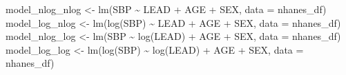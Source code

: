 \documentclass[
  letterpaper,
]{krantz}
\makeatletter
\newenvironment{Shaded}{\begin{snugshade}}{\end{snugshade}}
\newcommand{\AttributeTok}[1]{\textcolor[rgb]{0.40,0.45,0.13}{#1}}
\newcommand{\CommentTok}[1]{\textcolor[rgb]{0.37,0.37,0.37}{#1}}
\newcommand{\FunctionTok}[1]{\textcolor[rgb]{0.28,0.35,0.67}{#1}}
\newcommand{\NormalTok}[1]{\textcolor[rgb]{0.00,0.23,0.31}{#1}}
\newcommand{\OtherTok}[1]{\textcolor[rgb]{0.00,0.23,0.31}{#1}}
\newcommand{\SpecialCharTok}[1]{\textcolor[rgb]{0.37,0.37,0.37}{#1}}
\newenvironment{kframe}{%
\medskip{}
\setlength{\fboxsep}{.8em}
 \def\at@end@of@kframe{}%
 \ifinner\ifhmode%
  \def\at@end@of@kframe{\end{minipage}}%
  \begin{minipage}{\columnwidth}%
 \fi\fi%
 \def\FrameCommand##1{\hskip\@totalleftmargin \hskip-\fboxsep
 \colorbox{shadecolor}{##1}\hskip-\fboxsep
     \hskip-\linewidth \hskip-\@totalleftmargin \hskip\columnwidth}%
 \MakeFramed {\advance\hsize-\width
   \@totalleftmargin\z@ \linewidth\hsize
   \@setminipage}}%
 {\par\unskip\endMakeFramed%
 \at@end@of@kframe}
\renewenvironment{Shaded}{\begin{kframe}}{\end{kframe}}
\makeatother
\begin{document}
\begin{Shaded}
\begin{Highlighting}[]
\NormalTok{model\_nlog\_nlog }\OtherTok{\textless{}{-}} \FunctionTok{lm}\NormalTok{(SBP }\SpecialCharTok{\textasciitilde{}}\NormalTok{ LEAD }\SpecialCharTok{+}\NormalTok{ AGE }\SpecialCharTok{+}\NormalTok{ SEX, }\AttributeTok{data =}\NormalTok{ nhanes\_df)}
\NormalTok{model\_log\_nlog }\OtherTok{\textless{}{-}} \FunctionTok{lm}\NormalTok{(}\FunctionTok{log}\NormalTok{(SBP) }\SpecialCharTok{\textasciitilde{}}\NormalTok{ LEAD }\SpecialCharTok{+}\NormalTok{ AGE }\SpecialCharTok{+}\NormalTok{ SEX, }\AttributeTok{data =}\NormalTok{ nhanes\_df)}
\NormalTok{model\_nlog\_log }\OtherTok{\textless{}{-}} \FunctionTok{lm}\NormalTok{(SBP }\SpecialCharTok{\textasciitilde{}} \FunctionTok{log}\NormalTok{(LEAD) }\SpecialCharTok{+}\NormalTok{ AGE }\SpecialCharTok{+}\NormalTok{ SEX, }\AttributeTok{data =}\NormalTok{ nhanes\_df)}
\NormalTok{model\_log\_log }\OtherTok{\textless{}{-}} \FunctionTok{lm}\NormalTok{(}\FunctionTok{log}\NormalTok{(SBP) }\SpecialCharTok{\textasciitilde{}} \FunctionTok{log}\NormalTok{(LEAD) }\SpecialCharTok{+}\NormalTok{ AGE }\SpecialCharTok{+}\NormalTok{ SEX, }\AttributeTok{data =}\NormalTok{ nhanes\_df)}
\end{Highlighting}
\end{Shaded}

\begin{Shaded}
\end{Shaded}
\end{document}
